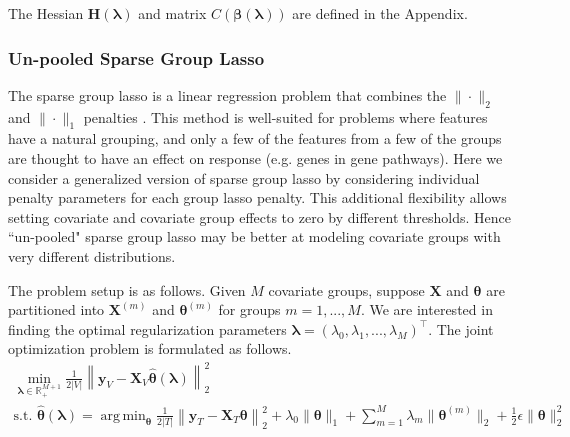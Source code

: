 \documentclass[12pt]{article}
\DeclareMathOperator*{\argmin}{arg\,min}
\begin{document}
The Hessian $\boldsymbol{H}(\boldsymbol\lambda)$ and matrix $C(\boldsymbol \beta( \boldsymbol \lambda))$ are defined in the Appendix.

\subsubsection{Un-pooled Sparse Group Lasso}\label{sec:sgl}

The sparse group lasso is a linear regression problem that combines the $\|\cdot\|_2$ and $\|\cdot\|_1$ penalties \citep{simon2013sparse}. This method is well-suited for problems where features have a natural grouping, and only a few of the features from a few of the groups are thought to have an effect on response (e.g. genes in gene pathways). Here we consider a generalized version of sparse group lasso by considering individual penalty parameters for each group lasso penalty. This additional flexibility allows setting covariate and covariate group effects to zero by different thresholds. Hence ``un-pooled" sparse group lasso may be better at modeling covariate groups with very different distributions.

The problem setup is as follows. Given $M$ covariate groups, suppose $\boldsymbol{X}$ and $\boldsymbol \theta$ are partitioned into $\boldsymbol{X}^{(m)}$ and $\boldsymbol \theta^{(m)}$ for groups $m = 1, ... , M$. We are interested in finding the optimal regularization parameters $\boldsymbol{\lambda} = (\lambda_0, \lambda_1, ...,  \lambda_M)^\top$. The joint optimization problem is formulated as follows.
\begin{equation}
\begin{array}{c}
\min_{\boldsymbol{\lambda} \in \mathbb{R}^{M+1}_{+}} \frac{1}{2|V|}
\left \| \boldsymbol{y}_V - \boldsymbol{X}_V \hat{\boldsymbol{\theta}}(\boldsymbol{\lambda}) \right \|^2_2 \\
\text{s.t. }
\hat{\boldsymbol{\theta}}(\boldsymbol{\lambda}) =
\argmin_{\boldsymbol{\theta}} \frac{1}{2|T|} 
\left \| \boldsymbol{y}_T - \boldsymbol{X}_T \boldsymbol{\theta} \right \|^2_2
+ \lambda_0 \| \boldsymbol\theta \|_1
+ \sum_{m=1}^M  \lambda_m \| \boldsymbol\theta^{(m)} \|_2
+ \frac{1}{2} \epsilon \| \boldsymbol\theta \|_2^2
\end{array}
\label{eq:unpooled_sgl}
\end{equation}
\end{document}
